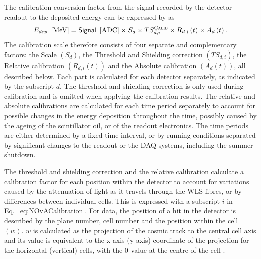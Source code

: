 

The calibration conversion factor from the signal recorded by the detector readout to the deposited energy can be expressed by as
\begin{equation}\label{eq:NOvACalibration}
E_{dep}\ \left[\unit{MeV}\right]=\textsf{Signal}\ \left[\unit{ADC}\right]\times S_d\times TS_{d,i}^{\textsc{Calib}}\times R_{d,i}\left(t\right)\times A_d\left(t\right).
\end{equation}
The calibration scale therefore consists of four separate and complementary factors: the Scale $\left(S_d\right)$, the Threshold and Shielding correction $\left(TS_{d,i}\right)$, the Relative calibration $\left(R_{d,i}\left(t\right)\right)$ and the Absolute calibration $\left(A_d\left(t\right)\right)$, all described below. Each part is calculated for each detector separately, as indicated by the subscript $d$. The threshold and shielding correction is only used during calibration and is omitted when applying the calibration results. The relative and absolute calibrations are calculated for each time period separately to account for possible changes in the energy deposition throughout the time, possibly caused by the ageing of the scintillator oil, or of the readout electronics. The time periods are either determined by a fixed time interval, or by running conditions separated by significant changes to the readout or the \gls{DAQ} systems, including the summer shutdown.

The threshold and shielding correction and the relative calibration calculate a calibration factor for each position within the detector to account for variations caused by the attenuation of light as it travels through the \gls{WLS} fibres, or by differences between individual cells. This is expressed with a subscript $i$ in Eq.~\ref{eq:NOvACalibration}. For data, the position of a hit in the detector is described by the plane number, cell number and the position within the cell $\left(w\right)$. $w$ is calculated as the projection of the cosmic track to the central cell axis and its value is equivalent to the x axis (y axis) coordinate of the projection for the horizontal (vertical) cells, with the 0 value at the centre of the cell \cite{PrabhjotNOvAThesis_CalibrationAndOscResults2019.pdf}.


